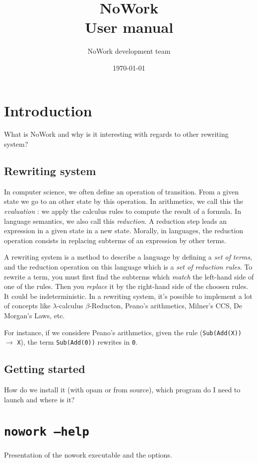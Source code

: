 \documentclass[12pt,a4paper]{article}
\title{NoWork\\
User manual}
\author{NoWork development team\\[2em]}
\date\today
\begin{document}
\maketitle


\section{Introduction}
What is NoWork and why is it interesting with regards to other rewriting system?

\subsection{Rewriting system}
In computer science, we often define an operation of transition. From a
given state we go to an other state by this operation. In arithmetics,
we call this the \emph{evaluation} : we apply the calculus rules to
compute the result of a formula. In language semantics, we also call
this \emph{reduction}. A reduction step leads an expression in a given
state in a new state. Morally, in languages, the reduction operation
consists in replacing subterms of an expression by other terms.

A rewriting system is a method to describe a language by defining a
\emph{set of terms}, and the reduction operation on this language which
is a \emph{set of reduction rules}. 
To rewrite a term, you must first find the subterms which \emph{match} the left-hand side of one of the rules. Then you \emph{replace} it by the right-hand side of the choosen rules. It
could be indeterministic. In a rewriting system, it's possible to implement a lot of concepts like
$\lambda$-calculus $\beta$-Reducton, Peano's arithmetics, Milner's CCS,
De Morgan's Laws, etc. 

For instance, if we considere Peano's arithmetics, 
given the rule (\texttt{Sub(Add(X))} $\rightarrow$ \texttt{X}),
the term \texttt{Sub(Add(0))} rewrites in \texttt{0}.

\subsection{Getting started}
How do we install it (with opam or from source), which program do I need to launch and where is it?

\section{\texttt{nowork --help}}
Presentation of the nowork executable and the options.
\end{document}
